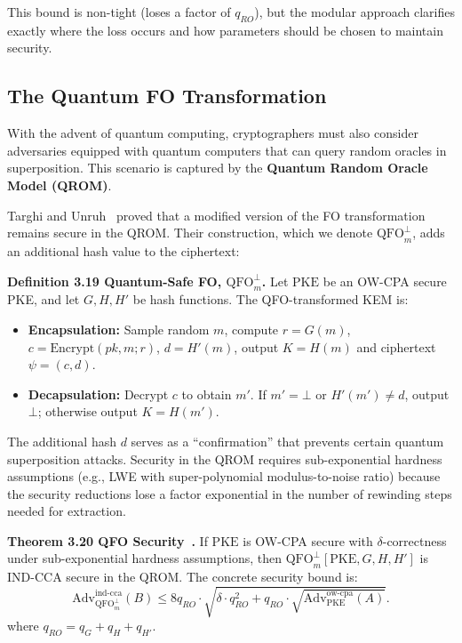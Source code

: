 This bound is non-tight (loses a factor of $q_{RO}$), but the modular approach clarifies exactly where the loss occurs and how parameters should be chosen to maintain security.

\subsection{The Quantum FO Transformation}

With the advent of quantum computing, cryptographers must also consider adversaries equipped with quantum computers that can query random oracles in superposition. This scenario is captured by the \textbf{Quantum Random Oracle Model (QROM)}.

Targhi and Unruh~\cite{targhi2016post} proved that a modified version of the FO transformation remains secure in the QROM. Their construction, which we denote $\text{QFO}_m^{\bot}$, adds an additional hash value to the ciphertext:

\noindent\textbf{Definition 3.19 Quantum-Safe FO, $\text{QFO}_m^{\bot}$.} Let $\text{PKE}$ be an OW-CPA secure PKE, and let $G, H, H'$ be hash functions. The QFO-transformed KEM is:
\begin{itemize}
    \item \textbf{Encapsulation:} Sample random $m$, compute $r = G(m)$, $c = \text{Encrypt}(pk, m; r)$, $d = H'(m)$, output $K = H(m)$ and ciphertext $\psi = (c, d)$.
    \item \textbf{Decapsulation:} Decrypt $c$ to obtain $m'$. If $m' = \bot$ or $H'(m') \neq d$, output $\bot$; otherwise output $K = H(m')$.
\end{itemize}

The additional hash $d$ serves as a ``confirmation'' that prevents certain quantum superposition attacks. Security in the QROM requires sub-exponential hardness assumptions (e.g., LWE with super-polynomial modulus-to-noise ratio) because the security reductions lose a factor exponential in the number of rewinding steps needed for extraction.

\noindent\textbf{Theorem 3.20 QFO Security~\cite{hofheinz2017modular}.} If $\text{PKE}$ is OW-CPA secure with $\delta$-correctness under sub-exponential hardness assumptions, then $\text{QFO}_m^{\bot}[\text{PKE}, G, H, H']$ is IND-CCA secure in the QROM. The concrete security bound is:
$$
\text{Adv}_{\text{QFO}^\perp_m}^{\text{ind-cca}}(B) \le 8q_{RO} \cdot \sqrt{\delta \cdot q_{RO}^2 + q_{RO} \cdot \sqrt{\text{Adv}_{\text{PKE}}^{\text{ow-cpa}}(A)}}.
$$
where $q_{RO}=q_G+q_H+q_{H'}$.

